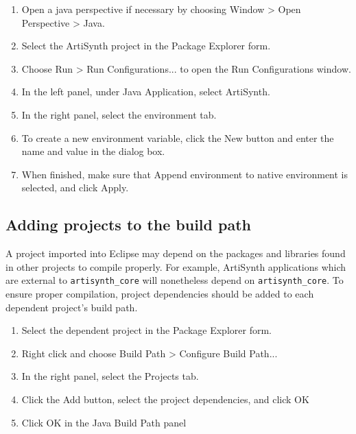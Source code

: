 \documentclass{article}
\begin{document}
\begin{enumerate}

\item Open a java perspective if necessary by choosing
  {\sf Window > Open Perspective > Java}.

\item Select the ArtiSynth project in the {\sf Package Explorer} form.

\item Choose {\sf Run > Run Configurations...} to open the {\sf Run
  Configurations} window.

\item In the left panel, under {\sf Java Application}, select {\sf ArtiSynth}.

\item In the right panel, select the {\sf environment} tab.

\item To create a new environment variable, click the {\sf New} button and
  enter the name and value in the dialog box.

\item When finished, make sure that {\sf Append environment to native
  environment} is selected, and click {\sf Apply}.

\end{enumerate}

\subsection{Adding projects to the build path}
\label{AddingProjectsToBuildPath}

A project imported into Eclipse may depend on the packages and
libraries found in other projects to compile properly.  For example,
ArtiSynth applications which are external to {\tt artisynth\_core}
will nonetheless depend on {\tt artisynth\_core}. To ensure
proper compilation, project dependencies should be added
to each dependent project's build path.

\begin{enumerate}

\item Select the dependent project in the {\sf Package Explorer} form.

\item Right click and choose {\sf Build Path > Configure Build Path...} 

\item In the right panel, select the {\sf Projects} tab.

\item Click the {\sf Add} button, select the project dependencies,
      and click {\sf OK}

\item Click {\sf OK} in the Java Build Path panel

\end{enumerate}
\end{document}
